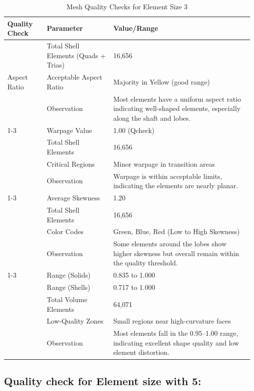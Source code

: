 \documentclass{book}
\begin{document}
\begin{itemize}[leftmargin=*,label=\textbullet]
\begin{itemize}
\begin{table}[h]
    \centering
    \caption{Mesh Quality Checks for Element Size 3}
    \label{tab:mesh_quality}
    \begin{tabularx}{\textwidth}{@{}lXX@{}}
        \toprule
        \textbf{Quality Check} & \textbf{Parameter} & \textbf{Value/Range} \\ \midrule
        \multirow{3}{*}{\centering Aspect Ratio} & Total Shell Elements (Quads + Trias) & 16,656 \\
        & Acceptable Aspect Ratio & Majority in Yellow (good range) \\
        & Observation & Most elements have a uniform aspect ratio indicating well-shaped elements, especially along the shaft and lobes. \\ \cmidrule(lr){1-3}
        \multirow{4}{*}{\centering Warpage} & Warpage Value & 1.00 (Qcheck) \\
        & Total Shell Elements & 16,656 \\
        & Critical Regions & Minor warpage in transition areas \\
        & Observation & Warpage is within acceptable limits, indicating the elements are nearly planar. \\ \cmidrule(lr){1-3}
        \multirow{4}{*}{\centering Skewness} & Average Skewness & 1.20 \\
        & Total Shell Elements & 16,656 \\
        & Color Codes & Green, Blue, Red (Low to High Skewness) \\
        & Observation & Some elements around the lobes show higher skewness but overall remain within the quality threshold. \\ \cmidrule(lr){1-3}
        \multirow{5}{*}{\centering Jacobian} & Range (Solids) & 0.835 to 1.000 \\
        & Range (Shells) & 0.717 to 1.000 \\
        & Total Volume Elements & 64,071 \\
        & Low-Quality Zones & Small regions near high-curvature faces \\
        & Observation & Most elements fall in the 0.95–1.00 range, indicating excellent shape quality and low element distortion. \\ \bottomrule
    \end{tabularx}
\end{table}
\subsection{Quality check for Element size with 5:}


\end{itemize}
\end{itemize}
\end{document}
